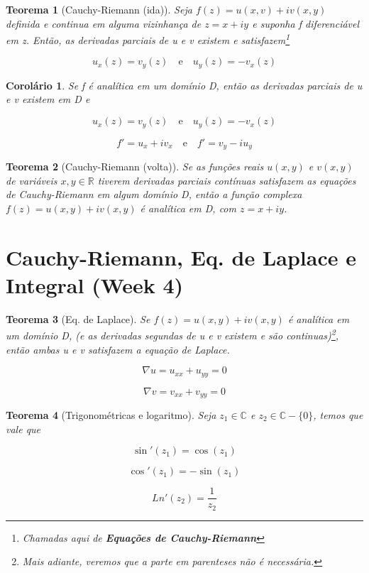 \documentclass{article}
\newtheorem{theorem}{Teorema}
\newtheorem{corollary}{Corolário}[theorem]
\begin{document}
\begin{theorem}[Cauchy-Riemann (ida)]
Seja $f(z) = u(x, v) + i v(x, y)$ definida e continua em alguma vizinhança de $z = x + i y$ e suponha f diferenciável em z. Então, as derivadas parciais de u e v existem e satisfazem\footnote{Chamadas aqui de \textbf{Equações de Cauchy-Riemann}}

$$u_x(z) = v_y(z)\quad\text{e}\quad u_y(z) = - v_x(z)$$
\end{theorem}

\begin{corollary}
Se f é analítica em um domínio D, então as derivadas parciais de u e v existem em D e

$$u_x(z) = v_y(z)\quad \text{e} \quad u_y(z) = - v_x(z)$$

$$f' = u_x + i v_x\quad \text{e} \quad f' = v_y - i u_y$$
\end{corollary}

\begin{theorem}[Cauchy-Riemann (volta)]
Se as funções reais $u(x, y)$ e $v(x, y)$ de variáveis $x, y \in \mathbb{R}$ tiverem derivadas parciais contínuas satisfazem as equações de Cauchy-Riemann em algum domínio D, então a função complexa $f(z) = u(x, y) + i v(x, y)$ é analítica em D, com $z = x + iy$.
\end{theorem}

\section*{Cauchy-Riemann, Eq. de Laplace e Integral (Week 4)}
\label{s4}
\begin{theorem}[Eq. de Laplace]
Se $f(z) = u(x, y) + i v(x, y)$ é analítica em um domínio D, (e as derivadas segundas de u e v existem e são continuas)\footnote{Mais adiante, veremos que a parte em parenteses não é necessária.}, então ambas u e v satisfazem a equação de Laplace.

$$\nabla u = u_{xx} + u_{yy} = 0$$

$$\nabla v = v_{xx} + v_{yy} = 0$$
\end{theorem}

\begin{theorem}[Trigonométricas e logaritmo]
Seja $z_1 \in \mathbb{C}$ e $z_2 \in \mathbb{C} - \{ 0 \}$, temos que vale que

$$\sin'(z_1) = \cos(z_1)$$

$$\cos'(z_1) = - \sin(z_1)$$

$$Ln'(z_2) = \frac{1}{z_2}$$
\end{theorem}
\end{document}
